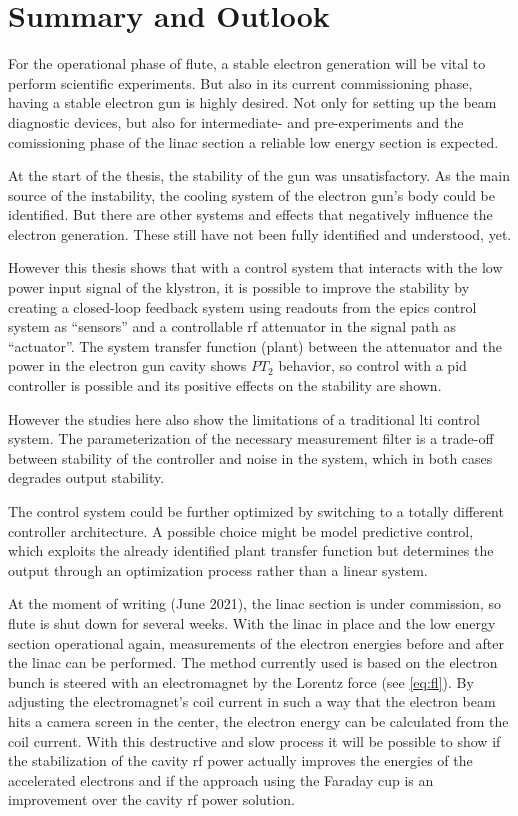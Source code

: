 \chapter{Summary and Outlook}
For the operational phase of \gls{flute}, a stable electron generation will be vital to perform scientific experiments. But also in its current commissioning phase, having a stable electron gun is highly desired. Not only for setting up the beam diagnostic devices, but also for intermediate- and pre-experiments and the comissioning phase of the \gls{linac} section a reliable low energy section is expected.

At the start of the thesis, the stability of the gun was unsatisfactory. As the main source of the instability, the cooling system of the electron gun's body could be identified. But there are other systems and effects that negatively influence the electron generation. These still have not been fully identified and understood, yet.

However this thesis shows that with a control system that interacts with the low power input signal of the klystron, it is possible to improve the stability by creating a closed-loop feedback system using readouts from the \gls{epics} control system as ``sensors'' and a controllable \gls{rf} attenuator in the signal path as ``actuator''. The system transfer function (plant) between the attenuator and the power in the electron gun cavity shows $PT_2$ behavior, so control with a \gls{pid} controller is possible and its positive effects on the stability are shown.

However the studies here also show the limitations of a traditional \gls{lti} control system. The parameterization of the necessary measurement filter is a trade-off between stability of the controller and noise in the system, which in both cases degrades output stability.

The control system could be further optimized by switching to a totally different controller architecture. A possible choice might be model predictive control, which exploits the already identified plant transfer function but determines the output through an optimization process rather than a linear system.

At the moment of writing (June 2021), the \gls{linac} section is under commission, so \gls{flute} is shut down for several weeks. With the \gls{linac} in place and the low energy section operational again, measurements of the electron energies before and after the \gls{linac} can be performed. The method currently used is based on the electron bunch is steered with an electromagnet by the Lorentz force (see \autoref{eq:fl}). By adjusting the electromagnet's coil current in such a way that the electron beam hits a camera screen in the center, the electron energy can be calculated from the coil current. With this destructive and slow process it will be possible to show if the stabilization of the cavity \gls{rf} power actually improves the energies of the accelerated electrons and if the approach using the Faraday cup is an improvement over the cavity \gls{rf} power solution.

